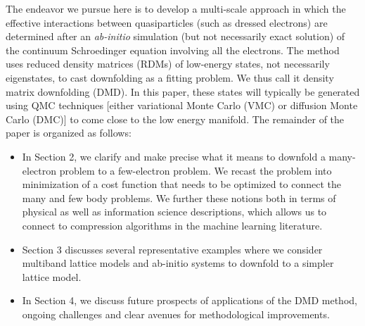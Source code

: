 The endeavor we pursue here is to develop a multi-scale approach in which the effective interactions between quasiparticles (such as dressed electrons) are determined after an \textit{ab-initio} simulation (but not necessarily exact solution) of the continuum Schroedinger equation involving all the electrons. 
The method uses reduced density matrices (RDMs) of low-energy states, not necessarily eigenstates, 
to cast downfolding as a fitting problem. 
We thus call it density matrix downfolding (DMD).
In this paper, these states will typically be generated using QMC techniques [either variational Monte Carlo (VMC) or diffusion Monte Carlo (DMC)] to come close to the low energy manifold.
The remainder of the paper is organized as follows:
\begin{itemize} 
\item 	In Section 2, we clarify and make precise what it means to downfold 
a many-electron problem to a few-electron problem. We recast the problem into minimization 
of a cost function that needs to be optimized to connect the many and few body problems. We further 
these notions both in terms of physical as well as information science descriptions, which allows us to connect to compression algorithms in the machine learning literature. 
\item Section 3 discusses several representative examples where we consider multiband lattice models 
and ab-initio systems to downfold to a simpler lattice model. 
\item In Section 4, we discuss future prospects of applications of the DMD method, ongoing challenges 
and clear avenues for methodological improvements. 
\end{itemize}


